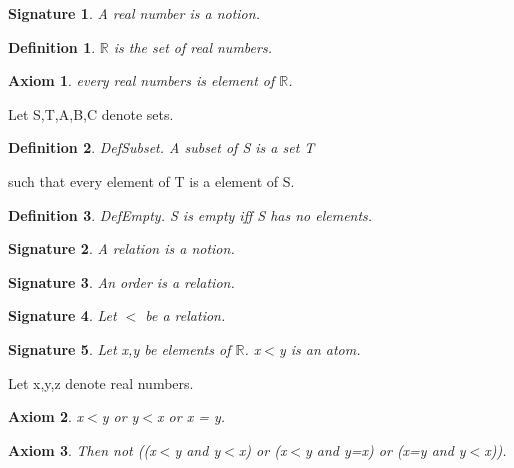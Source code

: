\documentclass{article}
\newenvironment{forthel}{\begin{leftbar}}{\end{leftbar}}
\newtheorem{axiom}{Axiom}
\newtheorem{definition}{Definition}
\newtheorem{signature}{Signature}
\begin{document}
\begin{forthel}
[set/-s] [element/-s] [belong/-s] [subset/-s] [relation/-s] [number/-s]

\begin{signature} A real number is a notion.

\end{signature}
\begin{definition} $\mathbb{R}$ is the set of real numbers. 

\end{definition}
\begin{axiom} every real numbers is element of $\mathbb{R}$.

\end{axiom}


Let S,T,A,B,C denote sets.

\begin{definition} DefSubset.   A subset of S is a set T

\end{definition}
such that every element of T is a element of S.

\begin{definition} DefEmpty.    S is empty iff S has no elements.

\end{definition}

\begin{signature} A relation is a notion.

\end{signature}

\begin{signature} An order is a relation.

\end{signature}

\begin{signature}Let $<$ be a relation.

\end{signature}

\begin{signature} Let x,y be elements of $\mathbb{R}$. x$<$y is an atom.

\end{signature}

Let x,y,z denote real numbers.

\begin{axiom} x$<$y or y$<$x or x = y.

\end{axiom}

\begin{axiom} Then not ((x$<$y and y$<$x) or (x$<$y and y=x) or (x=y and y$<$x)).


\end{axiom}
\end{forthel}
\end{document}
